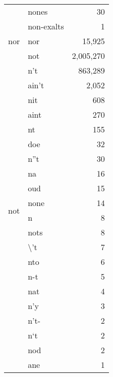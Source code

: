 \begin{longtable}[ht]{llr}
 & nones & {\cellcolor[HTML]{FFFFD9}} \color[HTML]{000000} 30 \\
 & non-exalts & {\cellcolor[HTML]{FFFFD9}} \color[HTML]{000000} 1 \\
\cline{1-3}
nor & nor & {\cellcolor[HTML]{FEFFD6}} \color[HTML]{000000} 15,925 \\
\cline{1-3}
\multirow[c]{30}{*}{not} & not & {\cellcolor[HTML]{081D58}} \color[HTML]{F1F1F1} 2,005,270 \\
 & n't & {\cellcolor[HTML]{63C3BF}} \color[HTML]{000000} 863,289 \\
 & ain't & {\cellcolor[HTML]{FFFFD9}} \color[HTML]{000000} 2,052 \\
 & nit & {\cellcolor[HTML]{FFFFD9}} \color[HTML]{000000} 608 \\
 & aint & {\cellcolor[HTML]{FFFFD9}} \color[HTML]{000000} 270 \\
 & nt & {\cellcolor[HTML]{FFFFD9}} \color[HTML]{000000} 155 \\
 & doe & {\cellcolor[HTML]{FFFFD9}} \color[HTML]{000000} 32 \\
 & n''t & {\cellcolor[HTML]{FFFFD9}} \color[HTML]{000000} 30 \\
 & na & {\cellcolor[HTML]{FFFFD9}} \color[HTML]{000000} 16 \\
 & oud & {\cellcolor[HTML]{FFFFD9}} \color[HTML]{000000} 15 \\
 & none & {\cellcolor[HTML]{FFFFD9}} \color[HTML]{000000} 14 \\
 & n & {\cellcolor[HTML]{FFFFD9}} \color[HTML]{000000} 8 \\
 & nots & {\cellcolor[HTML]{FFFFD9}} \color[HTML]{000000} 8 \\
 & \textbackslash 't & {\cellcolor[HTML]{FFFFD9}} \color[HTML]{000000} 7 \\
 & nto & {\cellcolor[HTML]{FFFFD9}} \color[HTML]{000000} 6 \\
 & n-t & {\cellcolor[HTML]{FFFFD9}} \color[HTML]{000000} 5 \\
 & nat & {\cellcolor[HTML]{FFFFD9}} \color[HTML]{000000} 4 \\
 & n'y & {\cellcolor[HTML]{FFFFD9}} \color[HTML]{000000} 3 \\
 & n't- & {\cellcolor[HTML]{FFFFD9}} \color[HTML]{000000} 2 \\
 & n`t & {\cellcolor[HTML]{FFFFD9}} \color[HTML]{000000} 2 \\
 & nod & {\cellcolor[HTML]{FFFFD9}} \color[HTML]{000000} 2 \\
 & ane & {\cellcolor[HTML]{FFFFD9}} \color[HTML]{000000} 1 \\

\end{longtable}
